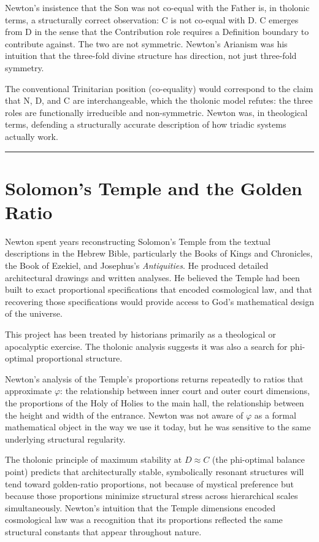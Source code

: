 \documentclass[12pt]{article}
\begin{document}
Newton's insistence that the Son was not co-equal with the Father is, in
tholonic terms, a structurally correct observation: C is not co-equal
with D. C emerges from D in the sense that the Contribution role
requires a Definition boundary to contribute against. The two are not
symmetric. Newton's Arianism was his intuition that the three-fold
divine structure has direction, not just three-fold symmetry.

The conventional Trinitarian position (co-equality) would correspond to
the claim that N, D, and C are interchangeable, which the tholonic model
refutes: the three roles are functionally irreducible and non-symmetric.
Newton was, in theological terms, defending a structurally accurate
description of how triadic systems actually work.

\begin{center}\rule{0.5\linewidth}{0.5pt}\end{center}

\section{Solomon's Temple and the Golden Ratio}\label{solomons-temple-and-the-golden-ratio}

Newton spent years reconstructing Solomon's Temple from the textual
descriptions in the Hebrew Bible, particularly the Books of Kings and
Chronicles, the Book of Ezekiel, and Josephus's \emph{Antiquities}. He
produced detailed architectural drawings and written analyses. He
believed the Temple had been built to exact proportional specifications
that encoded cosmological law, and that recovering those specifications
would provide access to God's mathematical design of the universe.

This project has been treated by historians primarily as a theological
or apocalyptic exercise. The tholonic analysis suggests it was also a
search for phi-optimal proportional structure.

Newton's analysis of the Temple's proportions returns repeatedly to
ratios that approximate \(\varphi\): the relationship between inner
court and outer court dimensions, the proportions of the Holy of Holies
to the main hall, the relationship between the height and width of the
entrance. Newton was not aware of \(\varphi\) as a formal mathematical
object in the way we use it today, but he was sensitive to the same
underlying structural regularity.

The tholonic principle of maximum stability at \(D \approx C\) (the
phi-optimal balance point) predicts that architecturally stable,
symbolically resonant structures will tend toward golden-ratio
proportions, not because of mystical preference but because those
proportions minimize structural stress across hierarchical scales
simultaneously. Newton's intuition that the Temple dimensions encoded
cosmological law was a recognition that its proportions reflected the
same structural constants that appear throughout nature.
\end{document}
